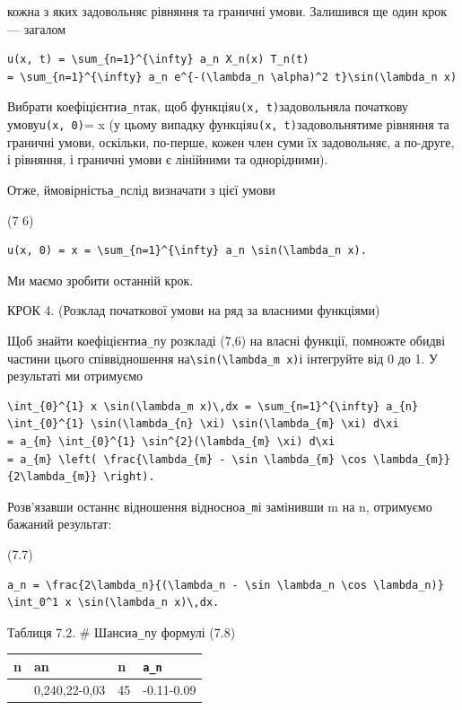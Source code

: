 \documentclass[
  ukrainian,
]{article}
\newcounter{none} %
\begin{document}
кожна з яких задовольняє рівняння та граничні умови. Залишився ще один
крок --- загалом

\begin{verbatim}
u(x, t) = \sum_{n=1}^{\infty} a_n X_n(x) T_n(t)
= \sum_{n=1}^{\infty} a_n e^{-(\lambda_n \alpha)^2 t}\sin(\lambda_n x)
\end{verbatim}

Вибрати коефіцієнти\texttt{a\_n}так, щоб
функція\texttt{u(x,\ t)}задовольняла початкову умову\texttt{u(x,\ 0)}= x
(у цьому випадку функція\texttt{u(x,\ t)}задовольнятиме рівняння та
граничні умови, оскільки, по-перше, кожен член суми їх задовольняє, а
по-друге, і рівняння, і граничні умови є лінійними та однорідними).

Отже, ймовірність\texttt{a\_n}слід визначати з цієї умови

(7 6)

\begin{verbatim}
u(x, 0) = x = \sum_{n=1}^{\infty} a_n \sin(\lambda_n x).
\end{verbatim}

Ми маємо зробити останній крок.

КРОК 4. (Розклад початкової умови на ряд за власними функціями)

Щоб знайти коефіцієнти\texttt{a\_n}у розкладі (7,6) на власні функції,
помножте обидві частини цього співвідношення
на\texttt{\textbackslash{}sin(\textbackslash{}lambda\_m\ x)}і інтегруйте
від 0 до 1. У результаті ми отримуємо

\begin{verbatim}
\int_{0}^{1} x \sin(\lambda_m x)\,dx = \sum_{n=1}^{\infty} a_{n} \int_{0}^{1} \sin(\lambda_{n} \xi) \sin(\lambda_{m} \xi) d\xi
= a_{m} \int_{0}^{1} \sin^{2}(\lambda_{m} \xi) d\xi
= a_{m} \left( \frac{\lambda_{m} - \sin \lambda_{m} \cos \lambda_{m}}{2\lambda_{m}} \right).
\end{verbatim}

Розв'язавши останнє відношення відносно\texttt{a\_m}і замінивши m на n,
отримуємо бажаний результат:

(7.7)

\begin{verbatim}
a_n = \frac{2\lambda_n}{(\lambda_n - \sin \lambda_n \cos \lambda_n)} \int_0^1 x \sin(\lambda_n x)\,dx.
\end{verbatim}

Таблиця 7.2. \# Шанси\texttt{a\_n}у формулі (7.8)

{\def\LTcaptype{none} %
\begin{longtable}[]{@{}llll@{}}
\toprule\noalign{}
n & an & n & \texttt{a\_n} \\
\midrule\noalign{}
\endhead
\bottomrule\noalign{}
\endlastfoot
123 & 0,240,22-0,03 & 45 & -0.11-0.09  \\
\end{longtable}
}
\end{document}
